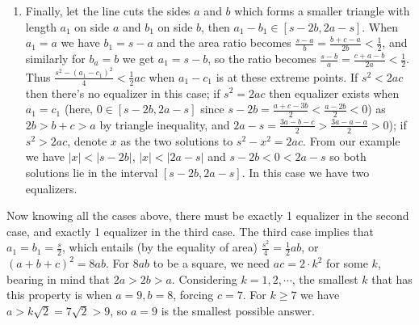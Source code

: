 \documentclass[11pt,a4paper]{article}
\newcommand{\<}{\langle}
\renewcommand{\>}{\rangle}
\begin{document}
\begin{enumerate}
\begin{enumerate}
		\item Finally, let the line cuts the sides $a$ and $b$ which forms a smaller triangle with length $a_1$ on side $a$ and $b_1$ on side $b$, then $a_1-b_1\in [s-2b, 2a-s]$. When $a_1=a$ we have $b_1=s-a$ and the area ratio becomes $\frac{s-a}{b}=\frac{b+c-a}{2b}<\frac 12$, and similarly for $b_a=b$ we get $a_1=s-b$, so the ratio becomes $\frac{s-b}{a}=\frac{c+a-b}{2a}<\frac 12$. Thus $\frac{s^2-(a_1-c_1)^2}{4}<\frac 12 ac$ when $a_1-c_1$ is at these extreme points. If $s^2<2ac$ then there's no equalizer in this case; if $s^2=2ac$ then equalizer exists when $a_1=c_1$ (here, $0\in [s-2b, 2a-s]$ since $s-2b=\frac{a+c-3b}{2}<\frac{a-2b}{2}<0$) as $2b>b+c>a$ by triangle inequality, and $2a-s=\frac{3a-b-c}{2}>\frac{3a-a-a}{2}>0$); if $s^2>2ac$, denote $x$ as the two solutions to $s^2-x^2=2ac$. From our example we have $|x|<|s-2b|$, $|x|<|2a-s|$ and $s-2b<0<2a-s$ so both solutions lie in the interval $[s-2b, 2a-s]$. In this case we have two equalizers. 
	\end{enumerate}
	Now knowing all the cases above, there must be exactly 1 equalizer in the second case, and exactly 1 equalizer in the third case. The third case implies that $a_1=b_1=\frac{s}{2}$, which entails (by the equality of area) $\frac{s^2}{4}=\frac 12 ab$, or $(a+b+c)^2=8ab$. For $8ab$ to be a square, we need $ac=2\cdot k^2$ for some $k$, bearing in mind that $2a>2b>a$. Considering $k=1, 2, \cdots$, the smallest $k$ that has this property is when $a=9, b=8$, forcing $c=7$. For $k\ge 7$ we have $a>k\sqrt{2}=7\sqrt{2}>9$, so $a=9$ is the smallest possible answer. 
\end{enumerate}
\end{document}
